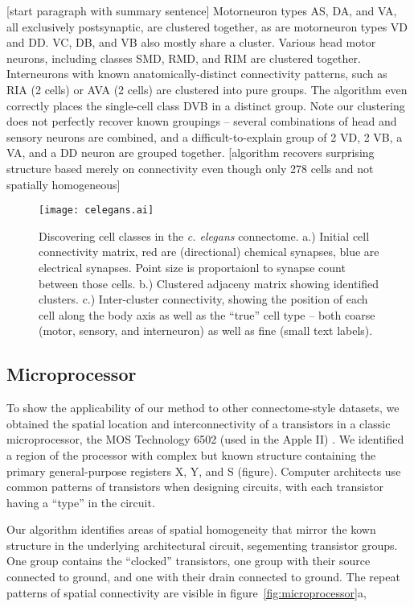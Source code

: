 \documentclass{article}
\begin{document}
[start paragraph with summary sentence] Motorneuron types AS, DA, and
VA, all exclusively postsynaptic, are clustered together, as are
motorneuron types VD and DD. VC, DB, and VB also mostly share a
cluster. Various head motor neurons, including classes SMD, RMD, and
RIM are clustered together. Interneurons with known
anatomically-distinct connectivity patterns, such as RIA (2 cells) or
AVA (2 cells) are clustered into pure groups. The algorithm even
correctly places the single-cell class DVB in a distinct group. Note
our clustering does not perfectly recover known groupings -- several
combinations of head and sensory neurons are combined, and a
difficult-to-explain group of 2 VD, 2 VB, a VA, and a DD neuron are
grouped together. [algorithm recovers surprising structure based
merely on connectivity even though only 278 cells and not spatially
homogeneous]


\begin{figure}
  \centering 
  \centerline{\texttt{[image: celegans.ai]}}
  \caption{Discovering cell classes in the \textit{c. elegans}
    connectome. a.) Initial cell connectivity matrix, red are
    (directional) chemical synapses, blue are electrical
    synapses. Point size is proportaionl to synapse count between
    those cells. b.) Clustered adjaceny matrix showing identified
    clusters. c.) Inter-cluster connectivity, showing the position of
    each cell along the body axis as well as the ``true'' cell type --
    both coarse (motor, sensory, and interneuron) as well as fine
    (small text labels). }
\end{figure}

\subsection{Microprocessor}

To show the applicability of our method to other connectome-style
datasets, we obtained the spatial location and interconnectivity of a
transistors in a classic microprocessor, the MOS Technology 6502 (used
in the Apple II) \autocite{datasource}. We identified a region of the
processor with complex but known structure containing the primary
general-purpose registers X, Y, and S (figure). Computer architects
use common patterns of transistors when designing circuits, 
with each transistor having a ``type'' in the circuit. 


Our algorithm identifies areas of spatial homogeneity that mirror the
kown structure in the underlying architectural circuit, segementing
transistor groups. One group contains the ``clocked'' transistors,
one group with their source connected to ground, and one with their
drain connected to ground. The repeat patterns of spatial connectivity
are visible in figure~\ref{fig:microprocessor}a, 
\end{document}
